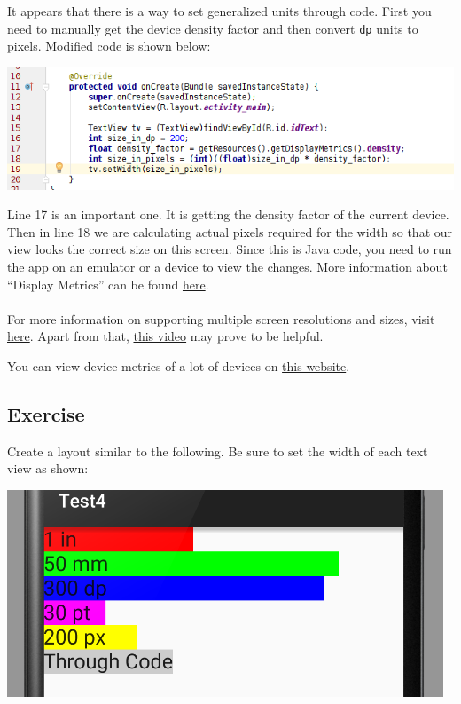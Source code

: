 It appears that there is a way to set generalized units through code. First you need to manually get the device density factor and then convert \texttt{dp} units to pixels. Modified code is shown below:

\begin{center}
	\includegraphics[scale=0.4]{chapters/ch06/images/5}
\end{center} 

Line 17 is an important one. It is getting the density factor of the current device. Then in line 18 we are calculating actual pixels required for the width so that our view looks the correct size on this screen. Since this is Java code, you need to run the app on an emulator or a device to view the changes. More information about ``Display Metrics'' can be found \href{https://developer.android.com/reference/android/util/DisplayMetrics.html}{here}.\\
\\

For more information on supporting multiple screen resolutions and sizes, visit \href{https://developer.android.com/guide/practices/screens_support.html}{here}. Apart from that, \href{https://www.youtube.com/watch?v=zhszwkcay2A}{this video} may prove to be helpful.

You can view device metrics of a lot of devices on \href{https://design.google.com/devices/}{this website}.

\subsection{Exercise}
Create a layout similar to the following. Be sure to set the width of each text view as shown:

\begin{center}
	\includegraphics[scale=0.4]{chapters/ch06/images/6}
\end{center} 

